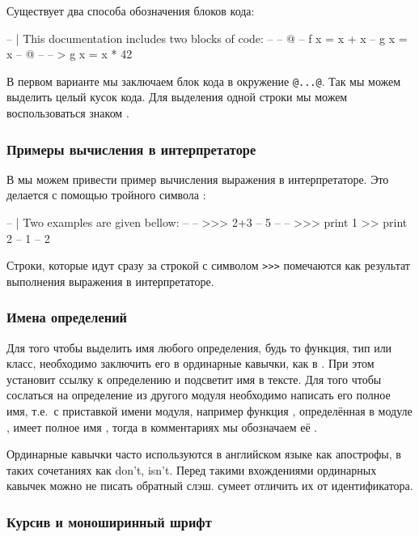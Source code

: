 Существует два способа обозначения блоков кода:

\begin{code}
-- | This documentation includes two blocks of code:
--
-- @
--     f x = x + x
--     g x = x
-- @
--
-- >  g x = x * 42
\end{code}

В первом варианте мы заключаем блок кода в окружение \verb!@...@!.
Так мы можем выделить целый кусок кода. Для выделения одной строки
мы можем воспользоваться знаком \In{>}.

\subsubsection{Примеры вычисления в интерпретаторе}

В  мы можем привести пример вычисления 
выражения в интерпретаторе. Это делается с помощью 
тройного символа \In{>}:

\begin{code}
-- | Two examples are given bellow:
--
-- >>> 2+3
-- 5
--
-- >>> print 1 >> print 2
-- 1
-- 2
\end{code}

Строки, которые идут сразу за строкой с символом \verb!>>>! 
помечаются как результат выполнения выражения в интерпретаторе.


\subsubsection{Имена определений}

Для того чтобы выделить имя любого определения, будь то
функция, тип или класс, необходимо заключить его в ординарные
кавычки, как в . При этом  установит
ссылку к определению и подсветит имя в тексте. 
Для того чтобы сослаться на определение из другого
модуля необходимо написать его полное имя, т.е.~с приставкой
имени модуля, например 
функция , определённая в модуле , имеет
полное имя , тогда в комментариях мы обозначаем
её . 

Ординарные кавычки часто используются в английском языке
как апострофы, в таких сочетаниях как don't, isn't. 
Перед такими вхождениями ординарных кавычек можно не писать
обратный слэш.  сумеет отличить их от идентификатора.

\subsubsection{Курсив и моноширинный шрифт}


